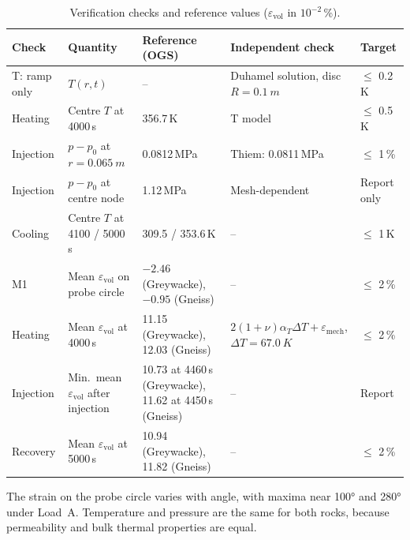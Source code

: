 \documentclass[11pt,a4paper]{article}
\begin{document}
\begin{table}[htbp]
\centering
\caption{Verification checks and reference values ($\varepsilon_\mathrm{vol}$ in $10^{-2}$\,\%).}
\label{tab:checks}
\small
\begin{tabularx}{\textwidth}{@{}lLLLl@{}}
\toprule
Check & Quantity & Reference (OGS) & Independent check & Target \\
\midrule
T: ramp only & $T(r,t)$ & -- & Duhamel solution, disc $R=\SI{0.1}{m}$ & $\le$ 0.2\,K \\
Heating   & Centre $T$ at 4000\,s & 356.7\,K & T model & $\le$ 0.5\,K \\
Injection & $p-p_0$ at $r=\SI{0.065}{m}$ & 0.0812\,MPa & Thiem: 0.0811\,MPa & $\le$ 1\,\% \\
Injection & $p-p_0$ at centre node & 1.12\,MPa & Mesh-dependent & Report only \\
Cooling   & Centre $T$ at 4100 / 5000\,s & 309.5 / 353.6\,K & -- & $\le$ 1\,K \\
M1        & Mean $\varepsilon_\mathrm{vol}$ on probe circle & $-2.46$ (Greywacke), $-0.95$ (Gneiss) & -- & $\le$ 2\,\% \\
Heating   & Mean $\varepsilon_\mathrm{vol}$ at 4000\,s & 11.15 (Greywacke), 12.03 (Gneiss) & $2(1+\nu)\alpha_T\Delta T+\varepsilon_\mathrm{mech}$, $\Delta T=\SI{67.0}{K}$ & $\le$ 2\,\% \\
Injection & Min.\ mean $\varepsilon_\mathrm{vol}$ after injection & 10.73 at 4460\,s (Greywacke), 11.62 at 4450\,s (Gneiss) & -- & Report \\
Recovery  & Mean $\varepsilon_\mathrm{vol}$ at 5000\,s & 10.94 (Greywacke), 11.82 (Gneiss) & -- & $\le$ 2\,\% \\
\bottomrule
\end{tabularx}
\end{table}

The strain on the probe circle varies with angle, with maxima near \ang{100}
and \ang{280} under Load~A. Temperature and pressure are the same for both
rocks, because permeability and bulk thermal properties are equal.

\end{document}
